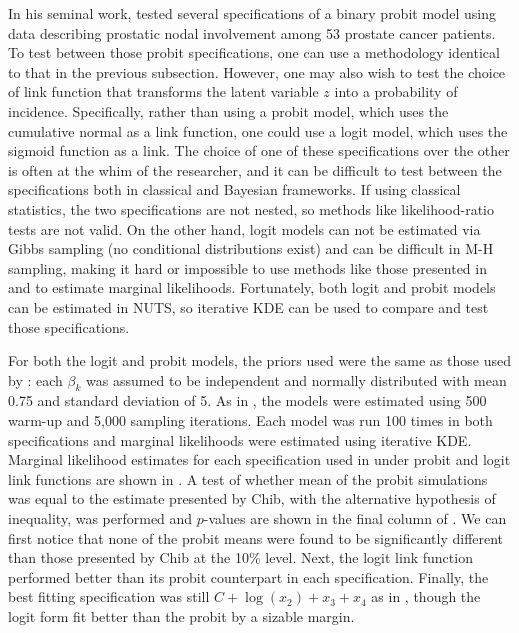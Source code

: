 \documentclass[twocolumn]{article}
\begin{document}


In his seminal work, \cite{Chib} tested several specifications of a binary probit model using data describing prostatic nodal involvement among 53 prostate cancer patients. To test between those probit specifications, one can use a methodology identical to that in the previous subsection. However, one may also wish to test the choice of link function that transforms the latent variable $z$ into a probability of incidence. Specifically, rather than using a probit model, which uses the cumulative normal as a link function, one could use a logit model, which uses the sigmoid function as a link. The choice of one of these specifications over the other is often at the whim of the researcher, and it can be difficult to test between the specifications both in classical and Bayesian frameworks. If using classical statistics, the two specifications are not nested, so methods like likelihood-ratio tests are not valid. On the other hand, logit models can not be estimated via Gibbs sampling (no conditional distributions exist) and can be difficult in M-H sampling, making it hard or impossible to use methods like those presented in \cite{Chib} and \cite{ChibJeliazkov} to estimate marginal likelihoods. Fortunately, both logit and probit models can be estimated in NUTS, so iterative KDE can be used to compare and test those specifications.

For both the logit and probit models, the priors used were the same as those used by \cite{Chib}: each $\beta_k$ was assumed to be independent and normally distributed with mean 0.75 and standard deviation of 5. As in \cite{Chib}, the models were estimated using 500 warm-up and 5,000 sampling iterations. Each model was run 100 times in both specifications and marginal likelihoods were estimated using iterative KDE. Marginal likelihood estimates for each specification used in \cite{Chib} under probit and logit link functions are shown in . A test of whether mean of the probit simulations was equal to the estimate presented by Chib, with the alternative hypothesis of inequality, was performed and $p$-values are shown in the final column of . We can first notice that none of the probit means were found to be significantly different than those presented by Chib at the 10\% level. Next, the logit link function performed better than its probit counterpart in each specification. Finally, the best fitting specification was still $C + \log(x_2) + x_3 + x_4$ as in \cite{Chib}, though the logit form fit better than the probit by a sizable margin.
\end{document}
